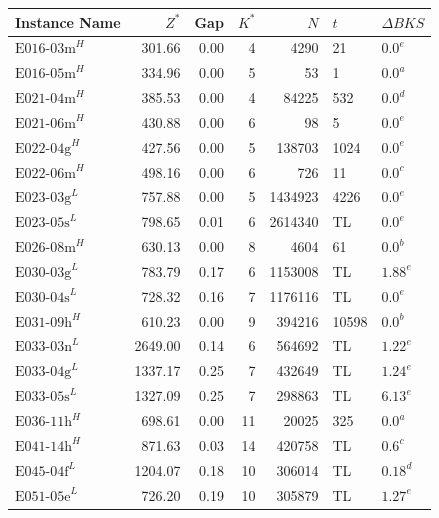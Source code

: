 \begin{table}[!ht]
	\centering
	\small
	\begin{tabular}{lrrrrll}
		\toprule
		Instance Name       & $Z^*$   & Gap  & $K^*$ & $N$     & $t$   & $\Delta BKS$    \\
		\midrule
		$\text{E016-03m}^H$ & 301.66  & 0.00 & 4     & 4290    & 21    & $\text{0.0}^e$  \\
		$\text{E016-05m}^H$ & 334.96  & 0.00 & 5     & 53      & 1     & $\text{0.0}^a$  \\
		$\text{E021-04m}^H$ & 385.53  & 0.00 & 4     & 84225   & 532   & $\text{0.0}^d$  \\
		$\text{E021-06m}^H$ & 430.88  & 0.00 & 6     & 98      & 5     & $\text{0.0}^e$  \\
		$\text{E022-04g}^H$ & 427.56  & 0.00 & 5     & 138703  & 1024  & $\text{0.0}^e$  \\
		$\text{E022-06m}^H$ & 498.16  & 0.00 & 6     & 726     & 11    & $\text{0.0}^c$  \\
		$\text{E023-03g}^L$ & 757.88  & 0.00 & 5     & 1434923 & 4226  & $\text{0.0}^e$  \\
		$\text{E023-05s}^L$ & 798.65  & 0.01 & 6     & 2614340 & TL    & $\text{0.0}^e$  \\
		$\text{E026-08m}^H$ & 630.13  & 0.00 & 8     & 4604    & 61    & $\text{0.0}^b$  \\
		$\text{E030-03g}^L$ & 783.79  & 0.17 & 6     & 1153008 & TL    & $\text{1.88}^e$ \\
		$\text{E030-04s}^L$ & 728.32  & 0.16 & 7     & 1176116 & TL    & $\text{0.0}^e$  \\
		$\text{E031-09h}^H$ & 610.23  & 0.00 & 9     & 394216  & 10598 & $\text{0.0}^b$  \\
		$\text{E033-03n}^L$ & 2649.00 & 0.14 & 6     & 564692  & TL    & $\text{1.22}^e$ \\
		$\text{E033-04g}^L$ & 1337.17 & 0.25 & 7     & 432649  & TL    & $\text{1.24}^e$ \\
		$\text{E033-05s}^L$ & 1327.09 & 0.25 & 7     & 298863  & TL    & $\text{6.13}^e$ \\
		$\text{E036-11h}^H$ & 698.61  & 0.00 & 11    & 20025   & 325   & $\text{0.0}^a$  \\
		$\text{E041-14h}^H$ & 871.63  & 0.03 & 14    & 420758  & TL    & $\text{0.6}^c$  \\
		$\text{E045-04f}^L$ & 1204.07 & 0.18 & 10    & 306014  & TL    & $\text{0.18}^d$ \\
		$\text{E051-05e}^L$ & 726.20  & 0.19 & 10    & 305879  & TL    & $\text{1.27}^e$ \\

\end{tabular}
\end{table}
